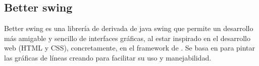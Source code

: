 \subsection{Better swing}

Better swing\cite{betterswing} es una librería de derivada de java swing que permite un desarrollo más amigable y sencillo de interfaces gráficas, al estar inspirado en el desarrollo web (HTML y CSS), concretamente, en el framework de . Se basa en  para pintar las gráficas de líneas creando  para facilitar su uso y manejabilidad.




